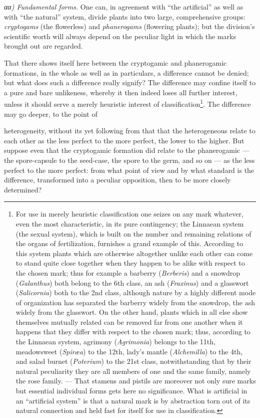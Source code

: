 \documentclass[12pt,a4paper]{book}
\begin{document}
\emph{αα) Fundamental forms.} One can, in agreement with ``the artificial'' as
well as with ``the natural'' system, divide plants into two large, comprehensive
groups: \emph{cryptogams} (the flowerless) and \emph{phanerogams} (flowering
plants); but the division's scientific worth will always depend on the peculiar
light in which the marks brought out are regarded.

That there shows itself here between the cryptogamic and phanerogamic formations,
in the whole as well as in particulars, a difference cannot be denied; but what
does such a difference really signify? The difference may confine itself to a
pure and bare unlikeness, whereby it then indeed loses all further interest,
unless it should serve a merely heuristic interest of classification\footnote{For
use in merely heuristic classification one seizes on any mark whatever, even the
most characteristic, in its pure contingency; the Linnaean system (the sexual
system), which is built on the number and remaining relations of the organs of
fertilization, furnishes a grand example of this. According to this system plants
which are otherwise altogether unlike each other can come to stand quite close
together when they happen to be alike with respect to the chosen mark; thus for
example a barberry (\textit{Berberis}) and a snowdrop (\textit{Galanthus}) both
belong to the 6th class, an ash (\textit{Fraxinus}) and a glasswort
(\textit{Salicornia}) both to the 2nd class, although nature by a highly different
mode of organization has separated the barberry widely from the snowdrop, the ash
widely from the glasswort. On the other hand, plants which in all else show
themselves mutually related can be removed far from one another when it happens
that they differ with respect to the chosen mark; thus, according to the Linnaean
system, agrimony (\textit{Agrimonia}) belongs to the 11th, meadowsweet
(\textit{Spiræa}) to the 12th, lady's mantle (\textit{Alchemilla}) to the 4th, and
salad burnet (\textit{Poterium}) to the 21st class, notwithstanding that by their
natural peculiarity they are all members of one and the same family, namely the
rose family. --- That stamens and pistils are moreover not only sure marks but
essential individual forms gets here no significance. What is artificial in an
``artificial system'' is that a natural mark is by abstraction torn out of its
natural connection and held fast for itself for use in classification.}. The
difference may go deeper, to the point of

heterogeneity, without its yet following from that that the heterogeneous relate
to each other as the less perfect to the more perfect, the lower to the higher.
But suppose even that the cryptogamic formation did relate to the phanerogamic
--- the spore-capsule to the seed-case, the spore to the germ, and so on --- as
the less perfect to the more perfect: from what point of view and by what standard
is the difference, transformed into a peculiar opposition, then to be more closely
determined?
\end{document}
